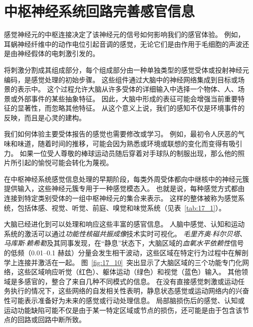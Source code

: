 \section{中枢神经系统回路完善感官信息}

感觉神经元的中枢连接决定了该神经元的信号如何影响我们的感官体验。 
例如，耳蜗神经纤维中的动作电位引起音调的感觉，无论它们是由作用于毛细胞的声波还是由神经假体的电刺激引发的。

将刺激分割成其组成部分，每个组成部分由一种单独类型的感觉受体或投射神经元编码，是感觉处理的初始步骤。
这些组件通过大脑中的神经网络集成到目标或场景的表示中。
这个过程允许大脑从许多受体的详细输入中选择一个物体、人、场景或外部事件的某些抽象特征。
因此，大脑中形成的表征可能会增强当前重要特征的显著性，而忽略其他特征。
从这个意义上说，我们的感知不仅是环境事件的反映，而且是心灵的建构。


我们如何体验主要受体报告的感觉也需要修改或学习。 
例如，最初令人厌恶的气味和味道，随着时间的推移，可能会因为熟悉或环境或联想的变化而变得有吸引力。
如果一位受人尊敬的棒球运动员随后穿着对手球队的制服出现，那么他的照片所引起的愉悦可能会转化为蔑视。


在中枢神经系统感觉信息处理的早期阶段，每类外周受体都向中继核中的神经元簇提供输入，这些神经元簇专用于一种感觉模态入。 
也就是说，每种感觉方式都由连接到特定类别受体的一组中枢神经元的集合来表示。 
这样的整体被称为感觉系统，包括体感、视觉、听觉、前庭、嗅觉和味觉系统（见表~\ref{tab:17_1}）。


大脑已经进化到可以处理和响应这些丰富的感官信息。 
人脑中感觉、认知和运动系统的激活可以通过\textit{功能性核磁共振成像}技术实时可视化。
\textit{毛里齐奥$\cdot$科尔贝塔}、\textit{马库斯$\cdot$赖希勒}及其同事发现，在“静息”状态下，大脑区域的\textit{血氧水平依赖性}信号的低频（0.01–0.1 赫兹）分量会发生相干波动，这些区域在特定行为过程中在解剖学上连接并激活在一起。
图~\ref{fig:17_10}~突出显示了大脑区域的三个功能专门化网络，这些区域响应听觉（红色）、躯体运动（绿色）和视觉（蓝色）输入。
其他领域是多感官的，整合了来自几种不同模式的信息。 
在没有直接感觉刺激或运动任务执行的情况下，这些网络的自发相关性表明，静息状态感觉或运动网络内的兴奋性可能表示准备好为未来的感觉或行动处理信息。 
局部脑损伤后的感觉、认知或运动功能缺陷可能不仅是由于某一特定区域或节点的损伤，还可能是由于包含该节点的回路或回路中断所致。


